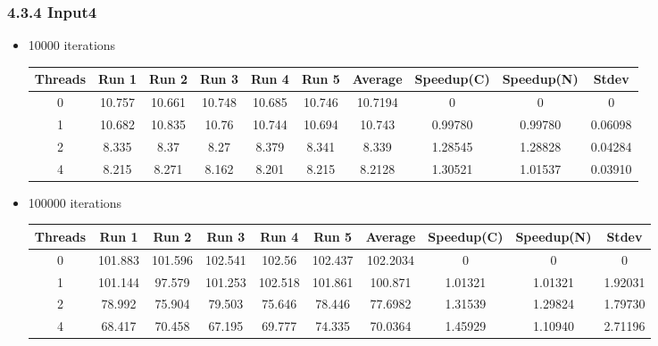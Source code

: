 \subsubsection*{4.3.4 Input4} 
 \begin{itemize}
\item 10000 iterations
\begin{center}
 \begin{adjustbox}{width=\columnwidth, center} 
 \begin{tabular}{ | |c | c c c c c | c | c c | c | |} \hline 
 Threads & Run 1 & Run 2 & Run 3 & Run 4 & Run 5 & Average & Speedup(C) & Speedup(N) & Stdev \\ [0.5ex] 
 \hline 
 \hline 
0& 10.757 & 10.661 & 10.748 & 10.685 & 10.746 & 10.7194 & 0 & 0 & 0\\ 
 \hline
1& 10.682 & 10.835 & 10.76 & 10.744 & 10.694 & 10.743 & 0.99780 & 0.99780 & 0.06098\\ 
 \hline
2& 8.335 & 8.37 & 8.27 & 8.379 & 8.341 & 8.339 & 1.28545 & 1.28828 & 0.04284\\ 
 \hline
4& 8.215 & 8.271 & 8.162 & 8.201 & 8.215 & 8.2128 & 1.30521 & 1.01537 & 0.03910\\ 
 \hline
\end{tabular} 
 \end{adjustbox} 
 \end{center} 
\item 100000 iterations
\begin{center}
 \begin{adjustbox}{width=\columnwidth, center} 
 \begin{tabular}{ | |c | c c c c c | c | c c | c | |} \hline 
 Threads & Run 1 & Run 2 & Run 3 & Run 4 & Run 5 & Average & Speedup(C) & Speedup(N) & Stdev \\ [0.5ex] 
 \hline 
 \hline 
0& 101.883 & 101.596 & 102.541 & 102.56 & 102.437 & 102.2034 & 0 & 0 & 0\\ 
 \hline
1& 101.144 & 97.579 & 101.253 & 102.518 & 101.861 & 100.871 & 1.01321 & 1.01321 & 1.92031\\ 
 \hline
2& 78.992 & 75.904 & 79.503 & 75.646 & 78.446 & 77.6982 & 1.31539 & 1.29824 & 1.79730\\ 
 \hline
4& 68.417 & 70.458 & 67.195 & 69.777 & 74.335 & 70.0364 & 1.45929 & 1.10940 & 2.71196\\ 
 \hline
\end{tabular} 
 \end{adjustbox} 
 \end{center} 
\end{itemize}
